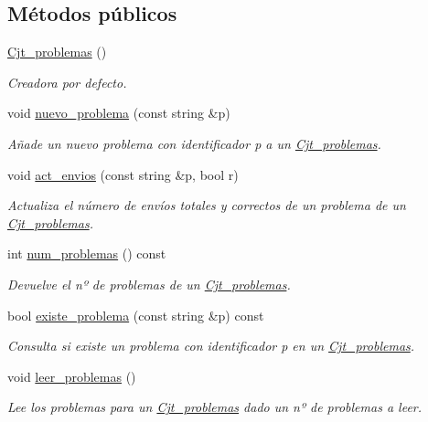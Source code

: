 \subsection*{Métodos públicos}
\begin{DoxyCompactItemize}
\item 
\mbox{\hyperlink{class_cjt__problemas_abc8bb814818ed290a0a99636cdca8519}{Cjt\+\_\+problemas}} ()
\begin{DoxyCompactList}\small\item\em Creadora por defecto. \end{DoxyCompactList}\item 
void \mbox{\hyperlink{class_cjt__problemas_a6c84adcab542d776e02f851eb9d3da82}{nuevo\+\_\+problema}} (const string \&p)
\begin{DoxyCompactList}\small\item\em Añade un nuevo problema con identificador p a un \mbox{\hyperlink{class_cjt__problemas}{Cjt\+\_\+problemas}}. \end{DoxyCompactList}\item 
void \mbox{\hyperlink{class_cjt__problemas_abb0defe688a1012b27eddc463b53bf18}{act\+\_\+envios}} (const string \&p, bool r)
\begin{DoxyCompactList}\small\item\em Actualiza el número de envíos totales y correctos de un problema de un \mbox{\hyperlink{class_cjt__problemas}{Cjt\+\_\+problemas}}. \end{DoxyCompactList}\item 
int \mbox{\hyperlink{class_cjt__problemas_aa713f6541f4d9b67497f047806a8374e}{num\+\_\+problemas}} () const
\begin{DoxyCompactList}\small\item\em Devuelve el nº de problemas de un \mbox{\hyperlink{class_cjt__problemas}{Cjt\+\_\+problemas}}. \end{DoxyCompactList}\item 
bool \mbox{\hyperlink{class_cjt__problemas_a90b230192705dd6f2e15fb10514a5814}{existe\+\_\+problema}} (const string \&p) const
\begin{DoxyCompactList}\small\item\em Consulta si existe un problema con identificador p en un \mbox{\hyperlink{class_cjt__problemas}{Cjt\+\_\+problemas}}. \end{DoxyCompactList}\item 
void \mbox{\hyperlink{class_cjt__problemas_a38d418d08be011f8cfbdfdac1ad2451a}{leer\+\_\+problemas}} ()
\begin{DoxyCompactList}\small\item\em Lee los problemas para un \mbox{\hyperlink{class_cjt__problemas}{Cjt\+\_\+problemas}} dado un nº de problemas a leer. \end{DoxyCompactList}\item 

\end{DoxyCompactItemize}
